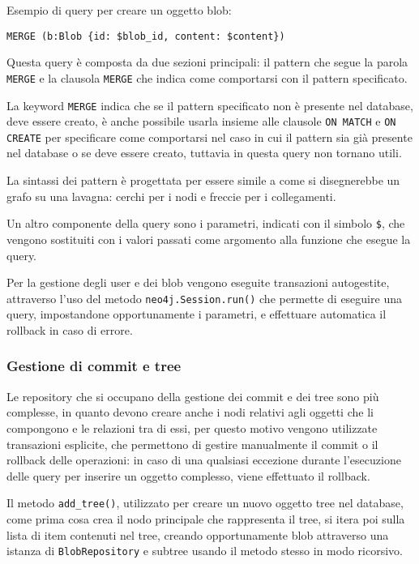 Esempio di query per creare un oggetto blob:
\begin{verbatim}
MERGE (b:Blob {id: $blob_id, content: $content})
\end{verbatim}
Questa query è composta da due sezioni principali: il pattern che segue la parola \texttt{MERGE} e la clausola \texttt{MERGE} che indica come comportarsi con il pattern specificato.

La keyword \texttt{MERGE} indica che se il pattern specificato non è presente nel database, deve essere creato, è anche possibile usarla insieme alle clausole \texttt{ON MATCH} e \texttt{ON CREATE} per specificare come comportarsi nel caso in cui il pattern sia già presente nel database o se deve essere creato, tuttavia in questa query non tornano utili. 

La sintassi dei pattern è progettata per essere simile a come si disegnerebbe un grafo su una lavagna: cerchi per i nodi e freccie per i collegamenti.

Un altro componente della query sono i parametri, indicati con il simbolo \texttt{\$}, che vengono sostituiti con i valori passati come argomento alla funzione che esegue la query.

Per la gestione degli user e dei blob vengono eseguite transazioni autogestite, attraverso l'uso del metodo \texttt{neo4j.Session.run()} che permette di eseguire una query, impostandone opportunamente i parametri, e effettuare automatica il rollback in caso di errore.

\subsubsection{Gestione di commit e tree}
Le repository che si occupano della gestione dei commit e dei tree sono più complesse, in quanto devono creare anche i nodi relativi agli oggetti che li compongono e le relazioni tra di essi, per questo motivo vengono utilizzate transazioni esplicite, che permettono di gestire manualmente il commit o il rollback delle operazioni: in caso di una qualsiasi eccezione durante l'esecuzione delle query per inserire un oggetto complesso, viene effettuato il rollback.

Il metodo \texttt{add\_tree()}, utilizzato per creare un nuovo oggetto tree nel database, come prima cosa crea il nodo principale che rappresenta il tree, si itera poi sulla lista di item contenuti nel tree, creando opportunamente blob attraverso una istanza di \texttt{BlobRepository} e subtree usando il metodo stesso in modo ricorsivo.

